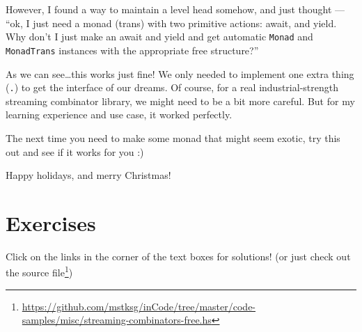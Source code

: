 \documentclass[]{article}
\renewcommand{\href}[2]{#2\footnote{\url{#1}}}
\begin{document}
However, I found a way to maintain a level head somehow, and just thought ---
``ok, I just need a monad (trans) with two primitive actions: await, and yield.
Why don't I just make an await and yield and get automatic \texttt{Monad} and
\texttt{MonadTrans} instances with the appropriate free structure?''

As we can see\ldots this works just fine! We only needed to implement one extra
thing (\texttt{.\textbar{}}) to get the interface of our dreams. Of course, for
a real industrial-strength streaming combinator library, we might need to be a
bit more careful. But for my learning experience and use case, it worked
perfectly.

The next time you need to make some monad that might seem exotic, try this out
and see if it works for you :)

Happy holidays, and merry Christmas!

\section{Exercises}\label{exercises}

Click on the links in the corner of the text boxes for solutions! (or just check
out
\href{https://github.com/mstksg/inCode/tree/master/code-samples/misc/streaming-combinators-free.hs}{the
source file})
\end{document}
